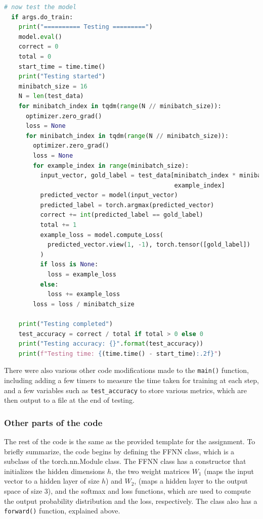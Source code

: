 \documentclass[conference]{IEEEtran}
\begin{document}
\begin{lstlisting}[language=Python]
  # now test the model
  if args.do_train:
    print("========== Testing =========")
    model.eval()
    correct = 0
    total = 0
    start_time = time.time()
    print("Testing started")
    minibatch_size = 16
    N = len(test_data)
    for minibatch_index in tqdm(range(N // minibatch_size)):
      optimizer.zero_grad()
      loss = None
      for minibatch_index in tqdm(range(N // minibatch_size)):
        optimizer.zero_grad()
        loss = None
        for example_index in range(minibatch_size):
          input_vector, gold_label = test_data[minibatch_index * minibatch_size +
                                               example_index]
          predicted_vector = model(input_vector)
          predicted_label = torch.argmax(predicted_vector)
          correct += int(predicted_label == gold_label)
          total += 1
          example_loss = model.compute_Loss(
            predicted_vector.view(1, -1), torch.tensor([gold_label])
          )
          if loss is None:
            loss = example_loss
          else:
            loss += example_loss
        loss = loss / minibatch_size

    print("Testing completed")
    test_accuracy = correct / total if total > 0 else 0
    print("Testing accuracy: {}".format(test_accuracy))
    print(f"Testing time: {(time.time() - start_time):.2f}")
\end{lstlisting}

There were also various other code modifications made to the \texttt{main()}
function, including adding a few timers to measure the time taken for training at each step, and a few variables such as \texttt{test\_accuracy} to store various metrics, which are then output to a file at the end of testing.

\subsubsection{Other parts of the code}

The rest of the code is the same as the provided template for the assignment. 
To briefly summarize, the code begins by defining the FFNN class, which is a subclass of the torch.nn.Module class. The FFNN class has a constructor that initializes the hidden dimensions $h$, the two weight matrices $W_1$ (maps the input vector to a hidden layer of size $h$) and $W_2$, (maps a hidden layer to the output space of size 3), and the softmax and loss functions, which are used to compute the output probability distribution and the loss, respectively. The class also has a \texttt{forward()} function, explained above.
\end{document}
